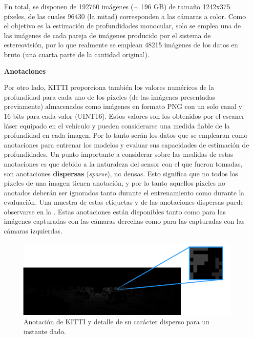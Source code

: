 En total, se disponen de 192760 imágenes ($\sim$ 196 GB) de tamaño 1242x375 píxeles, de las cuales 96430 (la mitad) corresponden a las cámaras a color. Como el objetivo es la estimación de profundidades monocular, solo se emplea una de las imágenes de cada pareja de imágenes producido por el sistema de estereovisión, por lo que realmente se emplean 48215 imágenes de los datos en bruto (una cuarta parte de la cantidad original).

\textbf{Anotaciones}

Por otro lado, KITTI proporciona también los valores numéricos de la profundidad para cada uno de los píxeles (de las imágenes presentadas previamente) almacenados como imágenes en formato PNG con un solo canal y 16 bits para cada valor (UINT16). Estos valores son los obtenidos por el escaner láser equipado en el vehículo y pueden considerarse una medida fiable de la profundidad en cada imagen. Por lo tanto serán los datos que se emplearan como anotaciones para entrenar los modelos y evaluar sus capacidades de estimación de profundidades. Un punto importante a considerar sobre las medidas de estas anotaciones es que debido a la naturaleza del sensor con el que fueron tomadas, son anotaciones \textbf{dispersas} (\textit{sparse}), no densas. Esto significa que no todos los píxeles de una imagen tienen anotación, y por lo tanto aquellos píxeles no anotados deberán ser ignorados tanto durante el entrenamiento como durante la evaluación. Una muestra de estas etiquetas y de las anotaciones dispersas puede observarse en la . Estas anotaciones están disponibles tanto como para las imágenes capturadas con las cámaras derechas como para las capturadas con las cámaras izquierdas.

\begin{figure}[H]
\centering
\includegraphics[width=\textwidth]{imagenes/depth67_img3_detail.png}
\caption{Anotación de KITTI y detalle de su carácter disperso para un instante dado.}
\label{fig:kitti_depth}

\end{figure}

